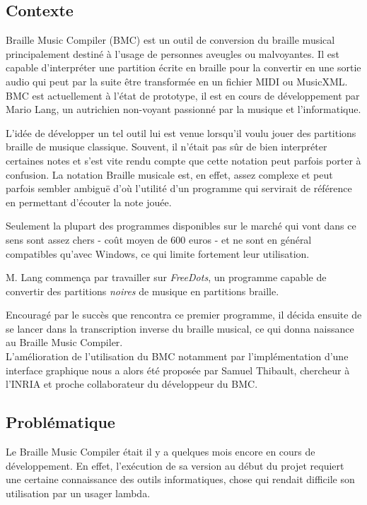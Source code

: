 \subsection*{Contexte}
Braille Music Compiler (BMC) est un outil de conversion du braille musical principalement destiné à l'usage de personnes aveugles ou malvoyantes. Il est capable d'interpréter une partition écrite en braille pour la convertir en une sortie audio qui peut par la suite être transformée en un fichier  MIDI ou MusicXML.\\

  BMC est actuellement à l'état de prototype, il est en cours de développement par Mario Lang, un autrichien non-voyant passionné par la musique et l'informatique.

  L'idée de développer un tel outil lui est venue lorsqu'il voulu jouer des partitions braille de musique classique. Souvent, il n'était pas sûr de bien interpréter certaines notes et s'est vite rendu compte que cette notation peut parfois porter à confusion. La notation Braille musicale est, en effet, assez complexe et peut parfois sembler ambiguë d'où l'utilité d'un programme qui servirait de référence en permettant d'écouter la note jouée. 
  
  Seulement la plupart des programmes disponibles sur le marché qui vont dans ce sens sont assez chers - coût moyen de 600 euros - et ne sont en général compatibles qu'avec Windows, ce qui limite fortement leur utilisation.
 
  M. Lang commença par travailler sur \textit{FreeDots}, un programme capable de convertir des partitions \textit{noires} de musique en partitions braille.

  Encouragé par le succès que rencontra ce premier programme, il décida ensuite de se lancer dans la transcription inverse du braille musical, ce qui donna naissance au Braille Music Compiler. \\
  
  L'amélioration de l'utilisation du BMC notamment par l'implémentation d'une interface graphique nous a alors été proposée par Samuel Thibault, chercheur à l'INRIA et proche collaborateur du développeur du BMC. 
  
  
 
\subsection*{Problématique}
Le Braille Music Compiler était il y a quelques mois encore en cours de développement. En effet, l'exécution de sa version au début du projet requiert une certaine connaissance des outils informatiques, chose qui rendait difficile son utilisation par un usager lambda.

